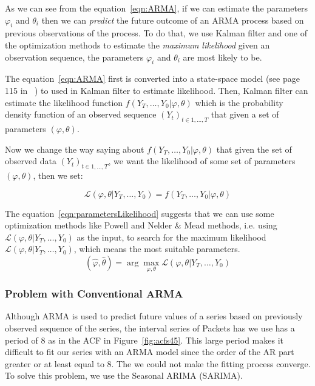\documentclass[12pt]{article}
\begin{document}
As we can see from the equation~\ref{eqn:ARMA}, if we can estimate the
parameters $\varphi_i$ and $\theta_i$ then we can \textit{predict} the future
outcome of an ARMA process based on previous observations of the process. To do
that, we use Kalman filter and one of the optimization methods to estimate the
\textit{maximum likelihood} given an observation sequence, the parameters
$\varphi_i$ and $\theta_i$ are most likely to be.

The equation~\ref{eqn:ARMA} first is converted into a state-space model (see
page 115 in~\cite{FalkStatSAS} ) to used in Kalman filter to estimate
likelihood. Then, Kalman filter can estimate the likelihood function
$f(Y_T,\ldots, Y_0|\varphi, \theta)$ which is the probability density
function of an observed sequence $(Y_t)_{t\in 1, \ldots, T}$ that given a set of
parameters $(\varphi, \theta)$.

Now we change the way saying about $f(Y_T,\ldots,Y_0|\varphi, \theta)$ that
given the set of observed data $(Y_t)_{t\in 1, \ldots, T}$, we want the likelihood of
some set of parameters $(\varphi, \theta)$, then we set:

\begin{equation}\label{eqn:parametersLikelihood}
\mathcal{L}(\varphi, \theta|Y_T,\ldots, Y_0) = f(Y_T,\ldots,Y_0|\varphi,
\theta)
\end{equation}

The equation~\ref{eqn:parametersLikelihood} suggests that we can use some
optimization methods like Powell and Nelder \& Mead methods, i.e. using
$\mathcal{L}(\varphi, \theta|Y_T,\ldots, Y_0)$ as the input, to search for the
maximum likelihood $\mathcal{L}(\varphi, \theta|Y_T,\ldots, Y_0)$, which means
the most suitable parameters.
\begin{equation}
(\hat{\varphi},\hat{\theta})=\arg\max_{\varphi, \theta} \mathcal{L}(\varphi,
\theta|Y_T,\ldots, Y_0)
\end{equation}

\subsubsection{Problem with Conventional ARMA}
Although ARMA is used to predict future values of a series based on
previously observed sequence of the series, the interval series of Packets has
we use has a period of 8 as in the ACF in Figure~\ref{fig:acfs45}. This large
period makes it difficult to fit our series with an ARMA model since the order of the AR
part greater or at least equal to 8. The we could not make the fitting process
converge. To solve this problem, we use the Seasonal ARIMA (SARIMA).
\end{document}
